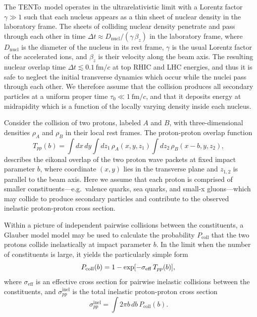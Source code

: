 \documentclass[aps,prc,reprint,amsmath,nofootinbib]{revtex4-1}
\newcommand{\trento}{T\raisebox{-0.5ex}{R}ENTo}
\newcommand{\fmc}{\ensuremath{\text{fm}/c}}
\begin{document}
The \trento\ model operates in the ultrarelativistic limit with a Lorentz factor $\gamma \gg 1$ such that each nucleus appears as a thin sheet of nuclear density in the laboratory frame.
The sheets of colliding nuclear density penetrate and pass through each other in time $\Delta t \approx D_\text{nucl} / (\gamma\, \beta_z)$ in the laboratory frame, where $D_\text{nucl}$ is the diameter of the nucleus in its rest frame, $\gamma$ is the usual Lorentz factor of the accelerated ions, and $\beta_z$ is their velocity along the beam axis.
The resulting nuclear overlap time $\Delta t \lesssim 0.1\ \fmc$ at top RHIC and LHC energies, and thus it is safe to neglect the initial transverse dynamics which occur while the nuclei pass through each other.
We therefore assume that the collision produces all secondary particles at a uniform proper time $\tau_0 \ll 1~\fmc$, and that it deposits energy at midrapidity which is a function of the locally varying density inside each nucleus.

Consider the collision of two protons, labeled $A$ and $B$, with three-dimensional densities $\rho_A$ and $\rho_B$ in their local rest frames.
The proton-proton overlap function
\begin{equation}
  \label{eq:tpp}
  T_{pp}(b) = \int dx\, dy \int dz_1\, \rho_A(x, y, z_1) \int dz_2\, \rho_B(x - b, y, z_2),
\end{equation}
describes the eikonal overlap of the two proton wave packets at fixed impact parameter $b$, where coordinate $(x, y)$ lies in the transverse plane and $z_{1,2}$ is parallel to the beam axis.
Here we assume that each proton is comprised of smaller constituents---e.g.\ valence quarks, sea quarks, and small-x gluons---which may collide to produce secondary particles and contribute to the observed inelastic proton-proton cross section.

Within a picture of independent pairwise collisions between the constituents, a Glauber model model may be used to calculate the probability $P_\mathrm{coll}$ that the two protons collide inelastically at impact parameter $b$. In the limit when the number of constituents is large, it yields the particularly simple form
\begin{equation}
  \label{eq:pcoll}
  P_\mathrm{coll}(b) = 1 - \exp[-\sigma_\mathrm{eff}\, T_{pp}(b)], \\
\end{equation}
where $\sigma_\mathrm{eff}$ is an effective cross section for pairwise inelastic collisions between the constituents, and $\sigma_{pp}^\mathrm{inel}$ is the total inelastic proton-proton cross section
\begin{equation}
  \label{eq:sigma_nn}
  \sigma_{pp}^\mathrm{inel} = \int 2 \pi b\, db\, P_\mathrm{coll}(b).
\end{equation}
\end{document}
